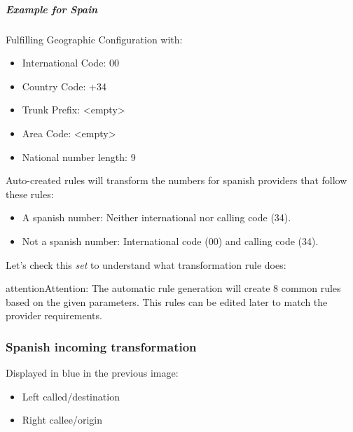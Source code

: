 \documentclass[letterpaper,10pt,english]{sphinxmanual}
\begin{document}
\subparagraph{Example for Spain}
\label{administration_portal/brand/settings/numeric_transformations:example-for-spain}
Fulfilling Geographic Configuration with:
\begin{itemize}
\item {} 
International Code: 00

\item {} 
Country Code: +34

\item {} 
Trunk Prefix: \textless{}empty\textgreater{}

\item {} 
Area Code: \textless{}empty\textgreater{}

\item {} 
National number length: 9

\end{itemize}

Auto-created rules will transform the numbers for spanish providers that follow these rules:
\begin{itemize}
\item {} 
A spanish number: Neither international nor calling code (34).

\item {} 
Not a spanish number: International code (00) and calling code (34).

\end{itemize}

Let's check this \emph{set} to understand what transformation rule does:

\begin{notice}{attention}{Attention:}
The automatic rule generation will create 8 common rules based on
the given parameters. This rules can be edited later to match the provider
requirements.
\end{notice}


\subsubsection{Spanish incoming transformation}
\label{administration_portal/brand/settings/numeric_transformations:spanish-incoming-transformation}
Displayed in blue in the previous image:
\begin{itemize}
\item {} 
Left called/destination

\item {} 
Right callee/origin

\end{itemize}
\end{document}
